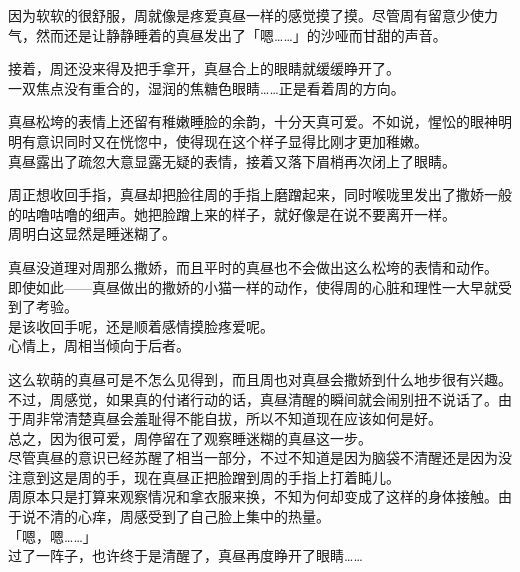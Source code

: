 因为软软的很舒服，周就像是疼爱真昼一样的感觉摸了摸。尽管周有留意少使力气，然而还是让静静睡着的真昼发出了「嗯……」的沙哑而甘甜的声音。

接着，周还没来得及把手拿开，真昼合上的眼睛就缓缓睁开了。\\

一双焦点没有重合的，湿润的焦糖色眼睛……正是看着周的方向。

真昼松垮的表情上还留有稚嫩睡脸的余韵，十分天真可爱。不如说，惺忪的眼神明明有意识同时又在恍惚中，使得现在这个样子显得比刚才更加稚嫩。\\

真昼露出了疏忽大意显露无疑的表情，接着又落下眉梢再次闭上了眼睛。

周正想收回手指，真昼却把脸往周的手指上磨蹭起来，同时喉咙里发出了撒娇一般的咕噜咕噜的细声。她把脸蹭上来的样子，就好像是在说不要离开一样。\\

周明白这显然是睡迷糊了。

真昼没道理对周那么撒娇，而且平时的真昼也不会做出这么松垮的表情和动作。\\

即使如此——真昼做出的撒娇的小猫一样的动作，使得周的心脏和理性一大早就受到了考验。\\

是该收回手呢，还是顺着感情摸脸疼爱呢。\\

心情上，周相当倾向于后者。

这么软萌的真昼可是不怎么见得到，而且周也对真昼会撒娇到什么地步很有兴趣。\\

不过，周感觉，如果真的付诸行动的话，真昼清醒的瞬间就会闹别扭不说话了。由于周非常清楚真昼会羞耻得不能自拔，所以不知道现在应该如何是好。\\

总之，因为很可爱，周停留在了观察睡迷糊的真昼这一步。\\

尽管真昼的意识已经苏醒了相当一部分，不过不知道是因为脑袋不清醒还是因为没注意到这是周的手，现在真昼正把脸蹭到周的手指上打着盹儿。\\

周原本只是打算来观察情况和拿衣服来换，不知为何却变成了这样的身体接触。由于说不清的心痒，周感受到了自己脸上集中的热量。\\

「嗯，嗯……」\\

过了一阵子，也许终于是清醒了，真昼再度睁开了眼睛……\\

